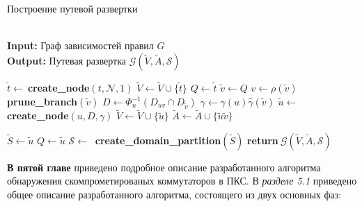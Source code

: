 \documentclass[14pt,autoref,href]{disser}
\theoremstyle{definition}
\begin{document}
\begin{algorithm}
\caption{Построение путевой развертки} \label{alg:create_path_scan}
\hspace*{\algorithmicindent} \\
\hspace*{\algorithmicindent} \textbf{Input:} Граф зависимостей правил $G$ \\
\hspace*{\algorithmicindent} \textbf{Output:} Путевая развертка $\mathcal{G}(\widetilde{V}, \widetilde{A}, \mathscr{S})$
\begin{algorithmic}[1]
    \State $\tilde{t}\gets\ $\textbf{create\_node}$(t, \mathcal{N}, 1)$
    \State $\widetilde{V}\gets \widetilde{V}\cup \{\tilde{t}\}$
    \State $Q\gets \tilde{t}$
\EndFor
{} \label{alg:create_path_scan:main_loop_begin}
    \State $\tilde{v}\gets Q$
    \State $v\gets \rho(\tilde{v})$
            \State \textbf{prune\_branch}$(\tilde{v})$
        \Else
            \State $D\gets \Phi^{-1}_{u}(D_{uv}\cap D_{\tilde{v}})$
            \State $\gamma\gets \gamma(u)\hat{\gamma}(\tilde{v})$
            \State $\tilde{u}\gets\ $\textbf{create\_node}$(u,D,\gamma)$
            \State $\widetilde{V}\gets \widetilde{V}\cup \{\tilde{u}\}$
            \State $\widetilde{A}\gets \widetilde{A}\cup \{\tilde{u}\tilde{v}\}$
            
                \State $\widetilde{S}\gets \tilde{u}$
            \Else
                \State $Q\gets \tilde{u}$
            \EndIf
        \EndIf
    \EndFor
\EndWhile \label{alg:create_path_scan:main_loop_end}
\State $\mathscr{S}\gets\ $ \textbf{create\_domain\_partition}$(\widetilde{S})$ \label{alg:create_path_scan:create_domain_partition}
\State \textbf{return}$\ \mathcal{G}(\widetilde{V}, \widetilde{A}, \mathscr{S})$
\EndProcedure
\end{algorithmic}
\end{algorithm}

\textbf{В пятой главе} приведено подробное описание разработанного алгоритма обнаружения скомпрометированых коммутаторов в ПКС.
В \emph{разделе 5.1} приведено общее описание разработанного алгоритма, состоящего из двух основных фаз:
\end{document}
